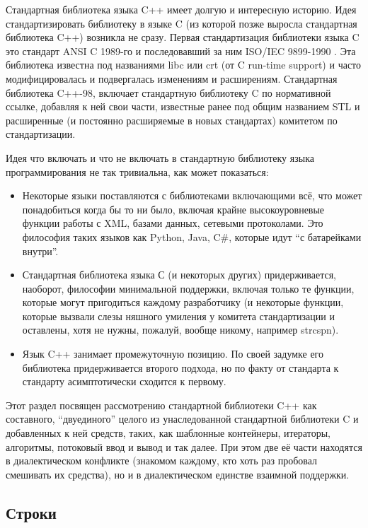\documentclass[a4paper,12pt,oneside]{article}
\begin{document}
Стандартная библиотека языка C++ имеет долгую и интересную историю. Идея стандартизировать библиотеку в языке C (из которой позже выросла стандартная библиотека C++) возникла не сразу. Первая стандартизация библиотеки языка C это стандарт ANSI C 1989-го и последовавший за ним ISO/IEC 9899-1990 \cite{stdc90}. Эта библиотека известна под названиями libc или crt (от C run-time support) и часто модифицировалась и подвергалась изменениям и расширениям. Стандартная библиотека C++-98, включает стандартную библиотеку C по нормативной ссылке, добавляя к ней свои части, известные ранее под общим названием STL и расширенные (и постоянно расширяемые в новых стандартах) комитетом по стандартизации.

Идея что включать и что не включать в стандартную библиотеку языка программирования не так тривиальна, как может показаться: 
\begin{itemize}
\item
Некоторые языки поставляются с библиотеками включающими всё, что может понадобиться когда бы то ни было, включая крайне высокоуровневые функции работы с XML, базами данных, сетевыми протоколами. Это философия таких языков как Python, Java, C\#, которые идут ``с батарейками внутри''.
\item
Стандартная библиотека языка С (и некоторых других) придерживается, наоборот, философии минимальной поддержки, включая только те функции, которые могут пригодиться каждому разработчику (и некоторые функции, которые вызвали слезы няшного умиления у комитета стандартизации и оставлены, хотя не нужны, пожалуй, вообще никому, например strcspn).
\item
Язык C++ занимает промежуточную позицию. По своей задумке его библиотека придерживается второго подхода, но по факту от стандарта к стандарту асимптотически сходится к первому.
\end{itemize}

Этот раздел посвящен рассмотрению стандартной библиотеки C++ как составного, ``двуединого'' целого из унаследованной стандартной библиотеки C и добавленных к ней средств, таких, как шаблонные контейнеры, итераторы, алгоритмы, потоковый ввод и вывод и так далее. При этом две её части находятся в диалектическом конфликте (знакомом каждому, кто хоть раз пробовал смешивать их средства), но и в диалектическом единстве взаимной поддержки.

\subsection{Строки}\label{subsec:strings}
\end{document}
